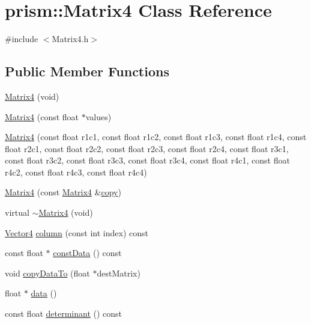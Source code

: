 \hypertarget{classprism_1_1_matrix4}{}\section{prism\+:\+:Matrix4 Class Reference}
\label{classprism_1_1_matrix4}


{\ttfamily \#include $<$Matrix4.\+h$>$}

\subsection*{Public Member Functions}
\begin{DoxyCompactItemize}
\item 
\hyperlink{classprism_1_1_matrix4_a9db27bce505b827ee46568fb105ff563}{Matrix4} (void)
\item 
\hyperlink{classprism_1_1_matrix4_a442f58d6a24413f1e2cb7cf6150c5fb9}{Matrix4} (const float $\ast$values)
\item 
\hyperlink{classprism_1_1_matrix4_a6e19410eb6de5dfdaeb989d3042176a1}{Matrix4} (const float r1c1, const float r1c2, const float r1c3, const float r1c4, const float r2c1, const float r2c2, const float r2c3, const float r2c4, const float r3c1, const float r3c2, const float r3c3, const float r3c4, const float r4c1, const float r4c2, const float r4c3, const float r4c4)
\item 
\hyperlink{classprism_1_1_matrix4_a1112c0939a2dc4112d0552cafd37dff0}{Matrix4} (const \hyperlink{classprism_1_1_matrix4}{Matrix4} \&\hyperlink{namespaceprism_ae776f4cd825f79e7af1cf6ee1d90a209}{copy})
\item 
virtual \hyperlink{classprism_1_1_matrix4_aa2117a89fa9caa8dc2b412edca5e0dd5}{$\sim$\+Matrix4} (void)
\item 
\hyperlink{classprism_1_1_vector4}{Vector4} \hyperlink{classprism_1_1_matrix4_ab7eaeaa15cc37f55e745ea864965e7ab}{column} (const int index) const 
\item 
const float $\ast$ \hyperlink{classprism_1_1_matrix4_a69244d86a13dce29f8f0a55f236b38fb}{const\+Data} () const 
\item 
void \hyperlink{classprism_1_1_matrix4_a03e5bcf5cf9a158588c375ed2e926cfd}{copy\+Data\+To} (float $\ast$dest\+Matrix)
\item 
float $\ast$ \hyperlink{classprism_1_1_matrix4_a44d98ab79e84733585994391561e2bec}{data} ()
\item 
const float \hyperlink{classprism_1_1_matrix4_adafd95c93e903c7d5971c860257e0921}{determinant} () const 

\end{DoxyCompactItemize}
